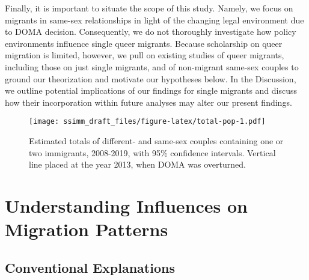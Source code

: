 \documentclass[
  12pt,
]{article}
\begin{document}
Finally, it is important to situate the scope of this study. Namely, we focus on migrants in same-sex relationships in light of the changing legal environment due to DOMA decision. Consequently, we do not thoroughly investigate how policy environments influence single queer migrants. Because scholarship on queer migration is limited, however, we pull on existing studies of queer migrants, including those on just single migrants, and of non-migrant same-sex couples to ground our theorization and motivate our hypotheses below. In the Discussion, we outline potential implications of our findings for single migrants and discuss how their incorporation within future analyses may alter our present findings.

\begin{figure}
\centering
\texttt{[image: ssimm\_draft\_files/figure-latex/total-pop-1.pdf]}
\caption{\label{fig:total-pop}Estimated totals of different- and same-sex couples containing one or two immigrants, 2008-2019, with 95\% confidence intervals. Vertical line placed at the year 2013, when DOMA was overturned.}
\end{figure}

\hypertarget{understanding-influences-on-migration-patterns}{%
\section{Understanding Influences on Migration Patterns}\label{understanding-influences-on-migration-patterns}}

\hypertarget{conventional-explanations}{%
\subsection{Conventional Explanations}\label{conventional-explanations}}
\end{document}
